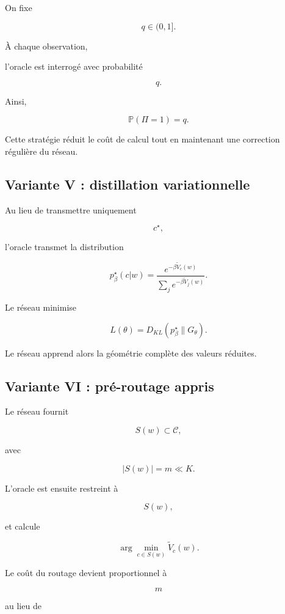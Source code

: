 On fixe

\[
q\in(0,1].
\]

À chaque observation,

l'oracle est interrogé avec probabilité

\[
q.
\]

Ainsi,

\[
\mathbb P
(\Pi=1)
=
q.
\]

Cette stratégie réduit le coût de calcul tout en maintenant une correction
régulière du réseau.


\subsection{Variante V : distillation variationnelle}

Au lieu de transmettre uniquement

\[
c^\star,
\]

l'oracle transmet la distribution

\[
p^\star_\beta(c|w)
=
\frac
{
e^{-\beta\widetilde V_c(w)}
}
{
\sum_j
e^{-\beta\widetilde V_j(w)}
}.
\]

Le réseau minimise

\[
L(\theta)
=
D_{KL}
\left(
p^\star_\beta
\|
G_\theta
\right).
\]

Le réseau apprend alors la géométrie complète des valeurs réduites.


\subsection{Variante VI : pré-routage appris}

Le réseau fournit

\[
S(w)
\subset
\mathcal C,
\]

avec

\[
|S(w)|=m\ll K.
\]

L'oracle est ensuite restreint à

\[
S(w),
\]

et calcule

\[
\arg\min_{c\in S(w)}
\widetilde V_c(w).
\]

Le coût du routage devient proportionnel à

\[
m
\]

au lieu de

